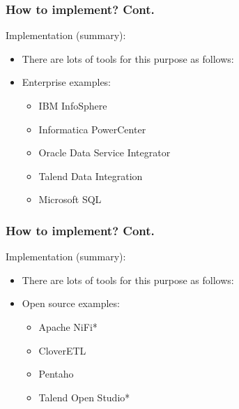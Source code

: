 
\begin{frame}
\frametitle{How to implement? Cont.}
\begin{wideitemize}
		\item Implementation (summary):
		\begin{itemize}[<+->]
			\item There are lots of tools for this purpose as follows:
			\item Enterprise examples:
			\begin{itemize}
				\item IBM InfoSphere
				\item Informatica PowerCenter
				\item Oracle Data Service Integrator
				\item Talend Data Integration				
				\item Microsoft SQL				
			\end{itemize}
		\end{itemize}
\end{wideitemize}
\end{frame}


\begin{frame}
\frametitle{How to implement? Cont.}
\begin{wideitemize}
	\item Implementation (summary):
	\begin{itemize}[<+->]
		\item There are lots of tools for this purpose as follows:
		\item Open source examples:
		\begin{itemize}
			\item Apache NiFi*
			\item CloverETL
			\item Pentaho
			\item Talend Open Studio*
		\end{itemize}			
	\end{itemize}
\end{wideitemize}
\end{frame}


